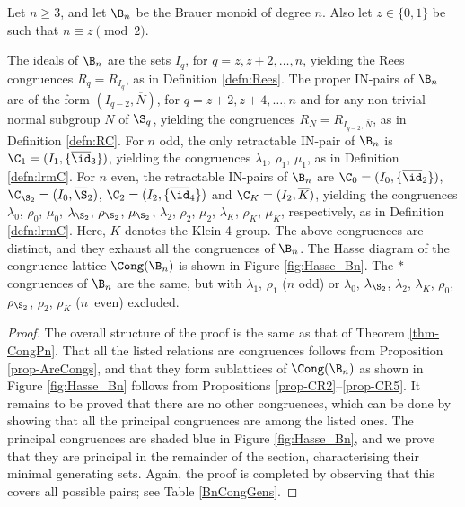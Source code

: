 \begin{thm}\label{CongBn}
Let $n\geq3$, and let $\B_n$ be the Brauer monoid of degree $n$.    Also let $z\in\{0,1\}$ be such that $n\equiv z\pmod{2}$.
\begin{itemize}
 The ideals of $\B_n$ are the sets $I_q$, for $q=z,z+2,\ldots,n$, yielding the Rees congruences $R_q=R_{I_q}$, as in Definition \ref{defn:Rees}.
 The proper IN-pairs of $\B_n$ are of the form $(I_{q-2},\overline N)$, for $q=z+2,z+4,\ldots,n$ and for any non-trivial normal subgroup $N$ of $\S_q$, yielding the congruences $R_N=R_{I_{q-2},\overline N}$, as in Definition \ref{defn:RC}.
 For $n$ odd, the only retractable IN-pair of $\B_n$ is $\C_1=(I_1,\{\overline\id_3\})$, yielding the congruences $\lambda_1$, $\rho_1$, $\mu_1$, as in Definition \ref{defn:lrmC}.
 For $n$ even, the retractable IN-pairs of $\B_n$ are $\C_0=(I_0,\{\overline{\id}_2\})$, $\C_{\S_2}=(I_0,\overline{\S}_2)$, $\C_2=(I_2,\{\overline{\id}_4\})$ and $\C_K=(I_2,\overline{K})$, yielding the congruences $\lambda_0$, $\rho_0$, $\mu_0$, $\lambda_{\S_2}$, $\rho_{\S_2}$, $\mu_{\S_2}$,
$\lambda_2$, $\rho_2$, $\mu_2$, $\lambda_K$, $\rho_K$, $\mu_K$, respectively, as in Definition \ref{defn:lrmC}.  Here, $K$ denotes the Klein 4-group.
 The above congruences are distinct, and they exhaust all the congruences of $\B_n$.
 The Hasse diagram of the congruence lattice $\Cong(\B_n) $ is shown in Figure \ref{fig:Hasse_Bn}.
 The $\ast$-congruences of $\B_n$ are the same, but with $\lambda_1$, $\rho_1$ ($n$ odd) or $\lambda_0$, $\lambda_{\S_2}$, $\lambda_2$, $\lambda_K$, $\rho_0$, $\rho_{\S_2}$, $\rho_2$, $\rho_K$ ($n$~even) excluded.
\end{itemize}
\end{thm}

\begin{proof}
The overall structure of the proof is the same as that of Theorem \ref{thm-CongPn}.
That all the listed relations are congruences follows from Proposition \ref{prop-AreCongs}, and
that they form sublattices of $\Cong(\B_n)$ as shown in Figure \ref{fig:Hasse_Bn}
follows from Propositions \ref{prop-CR2}--\ref{prop-CR5}.
It remains to be proved that there are no other congruences, which can be done by showing that all the principal congruences are among the listed ones.
The principal congruences are shaded blue in Figure \ref{fig:Hasse_Bn},
and we prove that they are principal in the remainder of the section, characterising their minimal generating sets.
Again, the proof is completed by observing that this covers all possible pairs; see Table \ref{BnCongGens}.
\end{proof}

